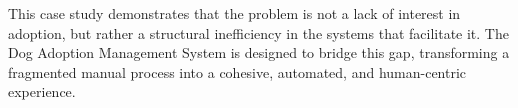 This case study demonstrates that the problem is not a lack of interest in adoption, but rather a structural inefficiency in the systems that facilitate it. The Dog Adoption Management System is designed to bridge this gap, transforming a fragmented manual process into a cohesive, automated, and human-centric experience.

